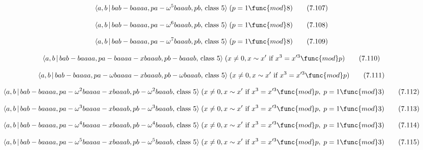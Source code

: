 \documentclass[10pt]{article}
\begin{document}
\begin{equation}
\langle a,b\,|\,bab-baaaa,pa-\omega ^{5}baaab,pb,\,\text{class }5\rangle
\;(p=1\func{mod}8)  \tag{7.107}
\end{equation}

\begin{equation}
\langle a,b\,|\,bab-baaaa,pa-\omega ^{6}baaab,pb,\,\text{class }5\rangle
\;(p=1\func{mod}8)  \tag{7.108}
\end{equation}

\begin{equation}
\langle a,b\,|\,bab-baaaa,pa-\omega ^{7}baaab,pb,\,\text{class }5\rangle
\;(p=1\func{mod}8)  \tag{7.109}
\end{equation}

\begin{equation}
\langle a,b\,|\,bab-baaaa,pa-baaaa-xbaaab,pb-baaab,\,\text{class }5\rangle
\;(x\neq 0,x\sim x^{\prime }\text{ if }x^{3}=x^{\prime 3}\func{mod}p) 
\tag{7.110}
\end{equation}

\begin{equation}
\langle a,b\,|\,bab-baaaa,pa-\omega baaaa-xbaaab,pb-\omega baaab,\,\text{%
class }5\rangle \;(x\neq 0,x\sim x^{\prime }\text{ if }x^{3}=x^{\prime 3}%
\func{mod}p)  \tag{7.111}
\end{equation}

\begin{equation}
\langle a,b\,|\,bab-baaaa,pa-\omega ^{2}baaaa-xbaaab,pb-\omega ^{2}baaab,\,%
\text{class }5\rangle \;(x\neq 0,x\sim x^{\prime }\text{ if }x^{3}=x^{\prime
3}\func{mod}p,\;p=1\func{mod}3)  \tag{7.112}
\end{equation}

\begin{equation}
\langle a,b\,|\,bab-baaaa,pa-\omega ^{3}baaaa-xbaaab,pb-\omega ^{3}baaab,\,%
\text{class }5\rangle \;(x\neq 0,x\sim x^{\prime }\text{ if }x^{3}=x^{\prime
3}\func{mod}p,\;p=1\func{mod}3)  \tag{7.113}
\end{equation}

\begin{equation}
\langle a,b\,|\,bab-baaaa,pa-\omega ^{4}baaaa-xbaaab,pb-\omega ^{4}baaab,\,%
\text{class }5\rangle \;(x\neq 0,x\sim x^{\prime }\text{ if }x^{3}=x^{\prime
3}\func{mod}p,\;p=1\func{mod}3)  \tag{7.114}
\end{equation}

\begin{equation}
\langle a,b\,|\,bab-baaaa,pa-\omega ^{5}baaaa-xbaaab,pb-\omega ^{5}baaab,\,%
\text{class }5\rangle \;(x\neq 0,x\sim x^{\prime }\text{ if }x^{3}=x^{\prime
3}\func{mod}p,\;p=1\func{mod}3)  \tag{7.115}
\end{equation}
\end{document}
